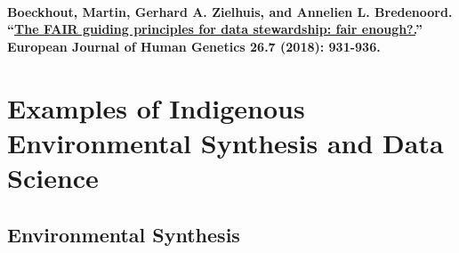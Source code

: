\documentclass[
]{book}
\begin{document}
\hypertarget{boeckhout-martin-gerhard-a.-zielhuis-and-annelien-l.-bredenoord.-the-fair-guiding-principles-for-data-stewardship-fair-enough.-european-journal-of-human-genetics-26.7-2018-931-936.-1}{%
\subsubsection*{\texorpdfstring{Boeckhout, Martin, Gerhard A. Zielhuis, and Annelien L. Bredenoord. ``\href{https://www.ncbi.nlm.nih.gov/pmc/articles/PMC6018669/}{The FAIR guiding principles for data stewardship: fair enough?.}'' European Journal of Human Genetics 26.7 (2018): 931-936.}{Boeckhout, Martin, Gerhard A. Zielhuis, and Annelien L. Bredenoord. ``The FAIR guiding principles for data stewardship: fair enough?.'' European Journal of Human Genetics 26.7 (2018): 931-936.}}\label{boeckhout-martin-gerhard-a.-zielhuis-and-annelien-l.-bredenoord.-the-fair-guiding-principles-for-data-stewardship-fair-enough.-european-journal-of-human-genetics-26.7-2018-931-936.-1}}

\hypertarget{examples-of-indigenous-environmental-synthesis-and-data-science}{%
\chapter{Examples of Indigenous Environmental Synthesis and Data Science}\label{examples-of-indigenous-environmental-synthesis-and-data-science}}

\hypertarget{environmental-synthesis}{%
\section{Environmental Synthesis}\label{environmental-synthesis}}
\end{document}
